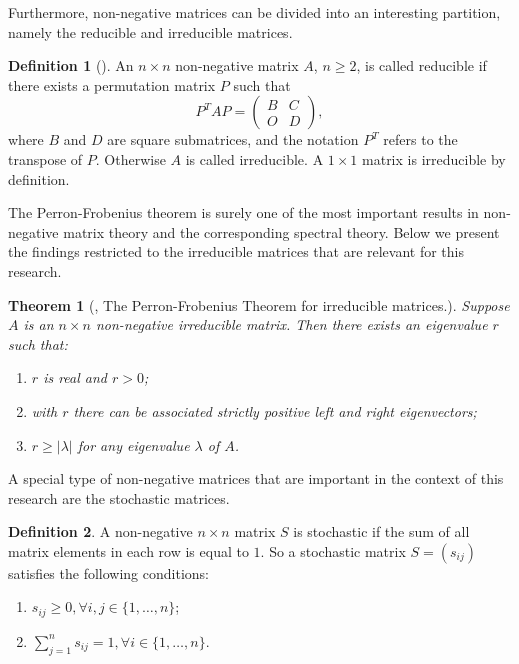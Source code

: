 \documentclass[11pt,a4paper]{article}
\newtheorem{theorem}{Theorem}[section]
\theoremstyle{definition}
\newtheorem{definition}{Definition}[section]
\theoremstyle{remark}
\begin{document}
Furthermore, non-negative matrices can be divided into an interesting partition, namely the reducible and irreducible matrices.

\begin{definition}[\cite{minc1988nonnegative}]
    An \(n \times n\) non-negative matrix \(A\), \( n \geqslant 2 \), is called reducible if there exists a permutation matrix \(P\) such that
    \[P^{T}AP = \begin{pmatrix}
        B & C \\
        O & D
    \end{pmatrix}, \]
    where \(B\) and \(D\) are square submatrices, and the notation \(P^{T}\) refers to the transpose of \(P\). Otherwise \(A\) is called irreducible. A \(1 \times 1\) matrix is irreducible by definition.
\end{definition}

The Perron-Frobenius theorem is surely one of the most important results in non-negative matrix theory and the corresponding spectral theory. Below we present the findings restricted to the irreducible matrices that are relevant for this research.

\begin{theorem}[\cite{seneta1973non}, The Perron-Frobenius Theorem for irreducible matrices.] \label{PerronFrobenius} Suppose \(A\) is an \(n \times n\) non-negative irreducible matrix. Then there exists an eigenvalue \(r\) such that:
\begin{enumerate}
    \item \(r\) is real and \(r>0\);
    \item with \(r\) there can be associated strictly positive left and right eigenvectors;
    \item \(r \geqslant |\lambda| \) for any eigenvalue \(\lambda\) of \(A\).
    
\end{enumerate}
\end{theorem}

A special type of non-negative matrices that are important in the context of this research are the stochastic matrices.

\begin{definition}
    A non-negative \(n \times n\) matrix \(S\) is stochastic if the sum of all matrix elements in each row is equal to \(1\). So a stochastic matrix \(S = (s_{ij}) \) satisfies the following conditions:
    \begin{enumerate}
        \item \(s_{ij} \geqslant 0, \forall i,j \in \{1, \ldots , n \}  \);
        \item \(\sum_{j=1}^{n} s_{ij} = 1, \forall i \in \{ 1, \ldots , n\}.\)
    \end{enumerate}
\end{definition}
\end{document}
